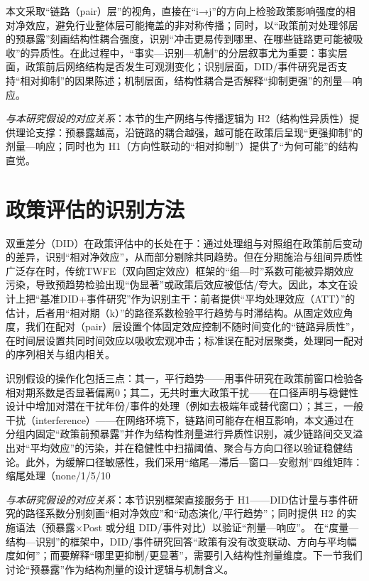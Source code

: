 本文采取“链路（pair）层”的视角，直接在“i→j”的方向上检验政策影响强度的相对净效应，避免行业整体层可能掩盖的非对称传播；同时，以“政策前对处理邻居的预暴露”刻画结构性耦合强度，识别“冲击更易传到哪里、在哪些链路更可能被吸收”的异质性。在此过程中，“事实—识别—机制”的分层叙事尤为重要：事实层面，政策前后网络结构是否发生可观测变化；识别层面，DID/事件研究是否支持“相对抑制”的因果陈述；机制层面，结构性耦合是否解释“抑制更强”的剂量—响应。

\noindent\textit{与本研究假设的对应关系}：本节的生产网络与传播逻辑为 H2（结构性异质性）提供理论支撑：预暴露越高，沿链路的耦合越强，越可能在政策后呈现“更强抑制”的剂量—响应；同时也为 H1（方向性联动的“相对抑制”）提供了“为何可能”的结构直觉。
\section{政策评估的识别方法}
双重差分（DID）在政策评估中的长处在于：通过处理组与对照组在政策前后变动的差异，识别“相对净效应”，从而部分剔除共同趋势。但在分期施治与组间异质性广泛存在时，传统TWFE（双向固定效应）框架的“组—时”系数可能被异期效应污染，导致预趋势检验出现“伪显著”或政策后效应被低估/夸大\citep{sun2021event}。因此，本文在设计上把“基准DID+事件研究”作为识别主干：前者提供“平均处理效应（ATT）”的估计，后者用“相对期（k）”的路径系数检验平行趋势与时滞结构。从固定效应角度，我们在配对（pair）层设置个体固定效应控制不随时间变化的“链路异质性”，在时间层设置共同时间效应以吸收宏观冲击；标准误在配对层聚类，处理同一配对的序列相关与组内相关\citep{bertrand2004much,cameron2015practitioner}。

识别假设的操作化包括三点：其一，平行趋势——用事件研究在政策前窗口检验各相对期系数是否显著偏离0；其二，无共时重大政策干扰——在口径声明与稳健性设计中增加对潜在干扰年份/事件的处理（例如去极端年或替代窗口）；其三，一般干扰（interference）——在网络环境下，链路间可能存在相互影响，本文通过在分组内固定“政策前预暴露”并作为结构性剂量进行异质性识别，减少链路间交叉溢出对“平均效应”的污染，并在稳健性中扫描阈值、聚合与方向口径以验证稳健结论\citep{aronow2017interference,athey2018network}。此外，为缓解口径敏感性，我们采用“缩尾—滞后—窗口—安慰剂”四维矩阵：缩尾处理（none/1/5/10%

\noindent\textit{与本研究假设的对应关系}：本节识别框架直接服务于 H1——DID估计量与事件研究的路径系数分别刻画“相对净效应”和“动态演化/平行趋势”；同时提供 H2 的实施语法（预暴露×Post 或分组 DID/事件对比）以验证“剂量—响应”。
在“度量—结构—识别”的框架中，DID/事件研究回答“政策有没有改变联动、方向与平均幅度如何”；而要解释“哪里更抑制/更显著”，需要引入结构性剂量维度。下一节我们讨论“预暴露”作为结构剂量的设计逻辑与机制含义。

